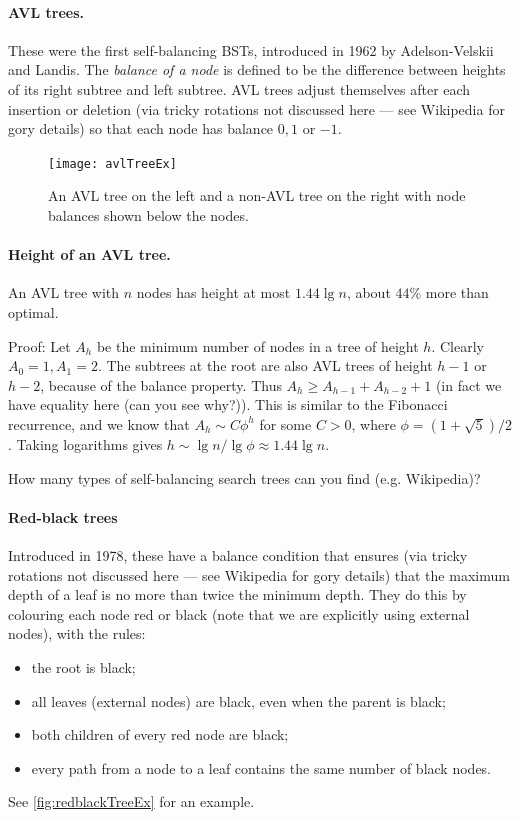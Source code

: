 \paragraph{AVL trees.}

These were the first self-balancing BSTs, introduced in 1962 by Adelson-Velskii and Landis. 
The \emph{balance of a node} is defined to be the difference between heights of its 
right subtree and left subtree. AVL trees adjust themselves after each insertion 
or deletion (via tricky rotations not discussed here --- see Wikipedia for gory details) so that each node has balance $0, 1$ or $-1$.

\begin{figure}[htb]
  \centering
  \texttt{[image: avlTreeEx]}
  \caption{An AVL tree on the left and a non-AVL tree on the right with node balances shown below the nodes.}
  \label{fig:avlTreeEx}
\end{figure} 

\paragraph{Height of an AVL tree.}
\begin{Example}
An AVL tree with $n$ nodes has height at most $1.44 \lg n$, about $44\%$ more 
than optimal.

Proof: Let $A_h$ be the minimum number of nodes in a tree of height $h$. Clearly 
$A_0 = 1, A_1 = 2$. The subtrees at the root are also AVL trees of height $h-1$ or $h-2$, 
because of the balance property. Thus $A_h \geq A_{h-1} + A_{h-2} + 1$ (in fact we have equality here 
(can you see why?)). This is similar to the Fibonacci recurrence, and we know that 
$A_h \sim C \phi^h$ for some $C>0$, where $\phi = (1+\sqrt{5})/2$. 
Taking logarithms gives $h \sim \lg n / \lg \phi \approx 1.44 \lg n$. 
\end{Example}

\begin{Boxample}[2]
How many types of self-balancing search trees can you find (e.g. Wikipedia)?

\end{Boxample}

\paragraph{Red-black trees}

Introduced in 1978, these have a balance condition that ensures (via tricky rotations not discussed here --- see Wikipedia for gory details) 
that the maximum depth of a leaf is no more than twice the minimum depth. 
They do this by colouring each node red or black (note that we are explicitly using external nodes), with the rules:
\begin{itemize}
\item the root is black;
\item all leaves (external nodes) are black, even when the parent is black;
\item both children of every red node are black;
\item every path from a node to a leaf contains the same number of black nodes.
\end{itemize}
See \cref{fig:redblackTreeEx} for an example.

